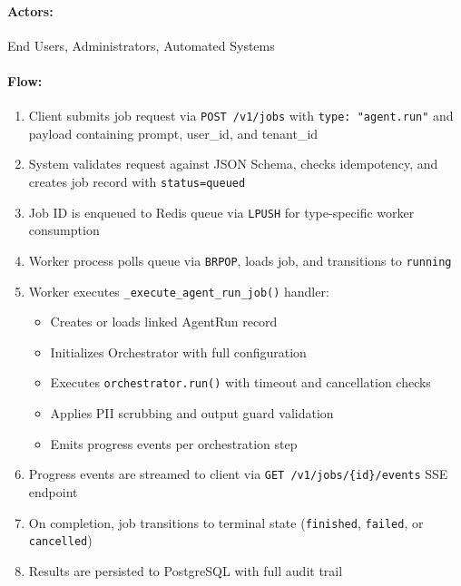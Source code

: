 \documentclass[a4paper,twoside]{sapthesis}
\begin{document}
\paragraph{Actors:} End Users, Administrators, Automated Systems

\paragraph{Flow:}
\begin{enumerate}
    \item Client submits job request via \texttt{POST /v1/jobs} with \texttt{type: "agent.run"} and payload containing prompt, user\_id, and tenant\_id
    \item System validates request against JSON Schema, checks idempotency, and creates job record with \texttt{status=queued}
    \item Job ID is enqueued to Redis queue via \texttt{LPUSH} for type-specific worker consumption
    \item Worker process polls queue via \texttt{BRPOP}, loads job, and transitions to \texttt{running}
    \item Worker executes \texttt{\_execute\_agent\_run\_job()} handler:
    \begin{itemize}
        \item Creates or loads linked AgentRun record
        \item Initializes Orchestrator with full configuration
        \item Executes \texttt{orchestrator.run()} with timeout and cancellation checks
        \item Applies PII scrubbing and output guard validation
        \item Emits progress events per orchestration step
    \end{itemize}
    \item Progress events are streamed to client via \texttt{GET /v1/jobs/\{id\}/events} SSE endpoint
    \item On completion, job transitions to terminal state (\texttt{finished}, \texttt{failed}, or \texttt{cancelled})
    \item Results are persisted to PostgreSQL with full audit trail
\end{enumerate}
\end{document}
